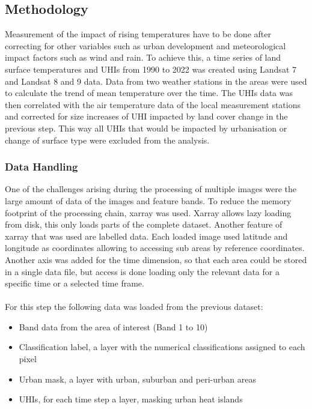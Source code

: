 \documentclass[12pt,a4paper, english,twoside]{scrartcl}
\begin{document}
    \subsection{Methodology}
      Measurement of the impact of rising temperatures have to be done after correcting for other variables such as urban development and meteorological impact factors such as wind and rain. 
      To achieve this, a time series of land surface temperatures and \glspl{UHI} from 1990 to 2022 was created using Landsat 7 and Landsat 8 and 9 data.
      Data from two weather stations in the areas were used to calculate the trend of mean temperature over the time. 
      The \glspl{UHI} data was then correlated with the air temperature data of the local measurement stations and corrected for size increases of \gls{UHI} impacted by land cover change in the previous step. 
      This way all \glspl{UHI} that would be impacted by urbanisation or change of surface type were excluded from the analysis.
    \subsubsection{Data Handling}
      One of the challenges arising during the processing of multiple images were the large amount of data of the images and feature bands. 
      To reduce the memory footprint of the processing chain, xarray \autocite{hoyer2017xarray} was used. 
      Xarray allows lazy loading from disk, this only loads parts of the complete dataset. 
      Another feature of xarray that was used are labelled data. Each loaded image used latitude and longitude as coordinates allowing to accessing sub areas by reference coordinates. 
      Another axis was added for the time dimension, so that each area could be stored in a single data file, but access is done loading only the relevant data for a specific time or a selected time frame.\\ \\ 
      For this step the following data was loaded from the previous dataset: 
      \begin{itemize}
        \item Band data from the area of interest (Band 1 to 10)
        \item Classification label, a layer with the numerical classifications assigned to each pixel 
        \item Urban mask, a layer with urban, suburban and peri-urban areas
        \item \glspl{UHI}, for each time step a layer, masking urban heat islands
      \end{itemize}
\end{document}
